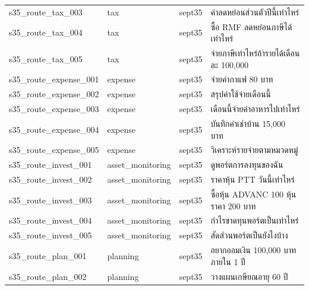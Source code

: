\documentclass[11pt,a4paper]{article}
\begin{document}
{\begin{longtable}{lllp{9.5cm}}
s35\_\allowbreak{}route\_\allowbreak{}tax\_\allowbreak{}003 & tax & sept35 & {\thaifont ค่าลดหย่อนส่วนตัวปีนี้เท่าไหร่} \\
s35\_\allowbreak{}route\_\allowbreak{}tax\_\allowbreak{}004 & tax & sept35 & {\thaifont ซื้อ }RMF {\thaifont ลดหย่อนภาษีได้เท่าไหร่} \\
s35\_\allowbreak{}route\_\allowbreak{}tax\_\allowbreak{}005 & tax & sept35 & {\thaifont จ่ายภาษีเท่าไหร่ถ้ารายได้เดือนละ }100,000 \\
s35\_\allowbreak{}route\_\allowbreak{}expense\_\allowbreak{}001 & expense & sept35 & {\thaifont จ่ายค่ากาแฟ }80 {\thaifont บาท} \\
s35\_\allowbreak{}route\_\allowbreak{}expense\_\allowbreak{}002 & expense & sept35 & {\thaifont สรุปค่าใช้จ่ายเดือนนี้} \\
s35\_\allowbreak{}route\_\allowbreak{}expense\_\allowbreak{}003 & expense & sept35 & {\thaifont เดือนนี้จ่ายค่าอาหารไปเท่าไหร่} \\
s35\_\allowbreak{}route\_\allowbreak{}expense\_\allowbreak{}004 & expense & sept35 & {\thaifont บันทึกค่าเช่าบ้าน }15,000 {\thaifont บาท} \\
s35\_\allowbreak{}route\_\allowbreak{}expense\_\allowbreak{}005 & expense & sept35 & {\thaifont วิเคราะห์รายจ่ายตามหมวดหมู่} \\
s35\_\allowbreak{}route\_\allowbreak{}invest\_\allowbreak{}001 & asset\_\allowbreak{}monitoring & sept35 & {\thaifont ดูพอร์ตการลงทุนของฉัน} \\
s35\_\allowbreak{}route\_\allowbreak{}invest\_\allowbreak{}002 & asset\_\allowbreak{}monitoring & sept35 & {\thaifont ราคาหุ้น }PTT {\thaifont วันนี้เท่าไหร่} \\
s35\_\allowbreak{}route\_\allowbreak{}invest\_\allowbreak{}003 & asset\_\allowbreak{}monitoring & sept35 & {\thaifont ซื้อหุ้น }ADVANC 100 {\thaifont หุ้น ราคา }200 {\thaifont บาท} \\
s35\_\allowbreak{}route\_\allowbreak{}invest\_\allowbreak{}004 & asset\_\allowbreak{}monitoring & sept35 & {\thaifont กำไรขาดทุนพอร์ตเป็นเท่าไหร่} \\
s35\_\allowbreak{}route\_\allowbreak{}invest\_\allowbreak{}005 & asset\_\allowbreak{}monitoring & sept35 & {\thaifont สัดส่วนพอร์ตเป็นยังไงบ้าง} \\
s35\_\allowbreak{}route\_\allowbreak{}plan\_\allowbreak{}001 & planning & sept35 & {\thaifont อยากออมเงิน }100,000 {\thaifont บาทภายใน }1 {\thaifont ปี} \\
s35\_\allowbreak{}route\_\allowbreak{}plan\_\allowbreak{}002 & planning & sept35 & {\thaifont วางแผนเกษียณอายุ }60 {\thaifont ปี} \\

\end{longtable}}
\end{document}
